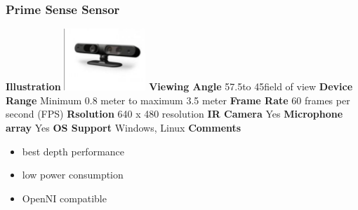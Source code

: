 \documentclass[a4paper,10pt]{report}
\begin{document}
\subsubsection{Prime Sense Sensor}
\textbf{Illustration}\newline
\includegraphics{./prime_sensor.png}
\newline
\textbf{Viewing Angle} 57.5\textdegree to 45\textdegree field of view\newline
\textbf{Device Range} Minimum 0.8 meter to maximum 3.5 meter\newline
\textbf{Frame Rate} 60 frames per second (FPS)\newline
\textbf{Rsolution} 640 x 480 resolution \newline
\textbf{IR Camera} Yes\newline
\textbf{Microphone array} Yes\newline
\textbf{OS Support} Windows, Linux\newline
\textbf{Comments}
\begin{itemize}
 \item best depth performance
 \item low power consumption
 \item OpenNI compatible
\end{itemize}
\end{document}

